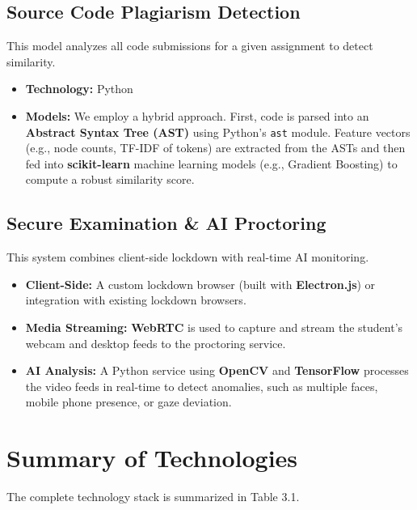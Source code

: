\subsection{Source Code Plagiarism Detection}
This model analyzes all code submissions for a given assignment to detect similarity.
\begin{itemize}
    \item \textbf{Technology:} Python
    \item \textbf{Models:} We employ a hybrid approach. First, code is parsed into an \textbf{Abstract Syntax Tree (AST)} using Python's \texttt{ast} module. Feature vectors (e.g., node counts, TF-IDF of tokens) are extracted from the ASTs and then fed into \textbf{scikit-learn} machine learning models (e.g., Gradient Boosting) to compute a robust similarity score.
\end{itemize}

\subsection{Secure Examination \& AI Proctoring}
This system combines client-side lockdown with real-time AI monitoring.
\begin{itemize}
    \item \textbf{Client-Side:} A custom lockdown browser (built with \textbf{Electron.js}) or integration with existing lockdown browsers.
    \item \textbf{Media Streaming:} \textbf{WebRTC} is used to capture and stream the student's webcam and desktop feeds to the proctoring service.
    \item \textbf{AI Analysis:} A Python service using \textbf{OpenCV} and \textbf{TensorFlow} processes the video feeds in real-time to detect anomalies, such as multiple faces, mobile phone presence, or gaze deviation.
\end{itemize}

\section{Summary of Technologies}
The complete technology stack is summarized in Table 3.1.

